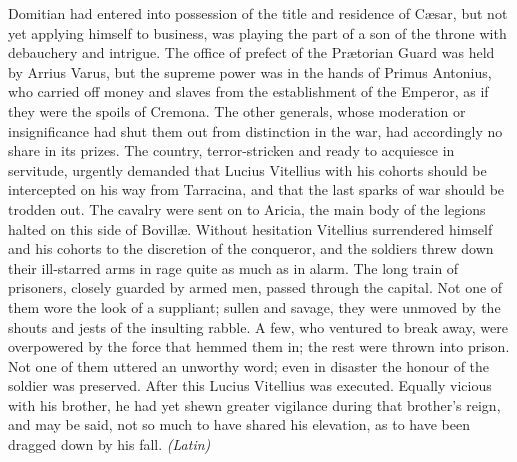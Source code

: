 Domitian had entered into possession of the title and residence of Cæsar, but not yet applying himself to business, was playing the part of a son of the throne with debauchery and intrigue. The office of prefect of the Prætorian Guard was held by Arrius Varus, but the supreme power was in the hands of Primus Antonius, who carried off money and slaves from the establishment of the Emperor, as if they were the spoils of Cremona. The other generals, whose moderation or insignificance had shut them out from distinction in the war, had accordingly no share in its prizes. The country, terror-stricken and ready to acquiesce in servitude, urgently demanded that Lucius Vitellius with his cohorts should be intercepted on his way from Tarracina, and that the last sparks of war should be trodden out. The cavalry were sent on to Aricia, the main body of the legions halted on this side of Bovillæ. Without hesitation Vitellius surrendered himself and his cohorts to the discretion of the conqueror, and the soldiers threw down their ill-starred arms in rage quite as much as in alarm. The long train of prisoners, closely guarded by armed men, passed through the capital. Not one of them wore the look of a suppliant; sullen and savage, they were unmoved by the shouts and jests of the insulting rabble. A few, who ventured to break away, were overpowered by the force that hemmed them in; the rest were thrown into prison. Not one of them uttered an unworthy word; even in disaster the honour of the soldier was preserved. After this Lucius Vitellius was executed. Equally vicious with his brother, he had yet shewn greater vigilance during that brother's reign, and may be said, not so much to have shared his elevation, as to have been dragged down by his fall. \emph{(Latin)}


